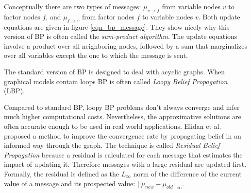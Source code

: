Conceptually there are two types of messages: $\mu_{v\rightarrow f}$ from variable nodes $v$ to factor nodes $f$, and $\mu_{f\rightarrow v}$ from factor nodes $f$ to variable nodes $v$. Both update equations are given in figure \ref{eqn_bp_message}. They show nicely why this version of BP is often called the \textit{sum-product algorithm}. The update equations involve a product over all neighboring nodes, followed by a sum that marginalizes over all variables except the one to which the message is sent.

The standard version of BP is designed to deal with acyclic graphs. When graphical models contain loops BP is often called \textit{Loopy Belief Propagation} (LBP).

Compared to standard BP, loopy BP problems don't always converge and infer much higher computational costs. Nevertheless, the approximative solutions are often accurate enough to be used in real world applications. Elidan et al. \cite{elidan2012residual} proposed a method to improve the convergence rate by propagating belief in an informed way through the graph. The technique is called \textit{Residual Belief Propagation} because a residual is calculated for each message that estimates the impact of updating it. Therefore messages with a large residual are updated first. Formally, the residual is defined as the $L_\infty$ norm of the difference of the current value of a message and its prospected value: $||\mu_{new} - \mu_{old}||_\infty$.

